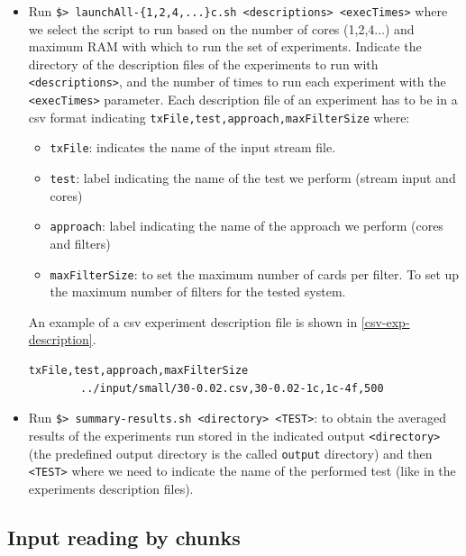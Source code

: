 \begin{itemize}
    \item Run \texttt{\$> launchAll-\{1,2,4,...\}c.sh <descriptions> <execTimes>} where we select the script to run based on the number of cores (1,2,4...) and maximum RAM with which to run the set of experiments. Indicate the directory of the description files of the experiments to run with \texttt{<descriptions>}, and the number of times to run each experiment with the \texttt{<execTimes>} parameter.
    Each description file of an experiment has to be in a csv format indicating \texttt{txFile,test,approach,maxFilterSize} where:
    \begin{itemize}
        \item \texttt{txFile}: indicates the name of the input stream file.
        \item \texttt{test}: label indicating the name of the test we perform (stream input and cores)
        \item \texttt{approach}: label indicating the name of the approach we perform (cores and filters)
        \item \texttt{maxFilterSize}: to set the maximum number of cards per filter. To set up the maximum number of filters for the tested system.
    \end{itemize}
    An example of a csv experiment description file is shown in \ref{csv-exp-description}.
    \begin{center}
    \lstset{style=cypherStyle}
    \begin{lstlisting}[caption={30-0.02-1c-4f}, label={csv-exp-description}]
        txFile,test,approach,maxFilterSize
        ../input/small/30-0.02.csv,30-0.02-1c,1c-4f,500
    \end{lstlisting}
    \end{center}
    \item Run \texttt{\$> summary-results.sh <directory> <TEST>}: to obtain the averaged results of the experiments run stored in the indicated output \texttt{<directory>} (the predefined output directory is the called \texttt{output} directory) and then \texttt{<TEST>} where we need to indicate the name of the performed test (like in the experiments description files).
\end{itemize}



\subsection{Input reading by chunks}\label{input-reading}

